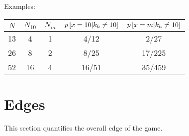 \noindent
Examples:
\begin{center}
\begin{tabular}{|c|c|c||c|c|}
\hline
$N$ & $N_10$ & $N_m$ & $p\left[x=10|k_h\neq{}10\right]$ & $p\left[x=m|k_h\neq{}10\right]$ \\ \hline \hline
13 & 4 & 1 & 4/12 & 2/27 \\ \hline
26 & 8 & 2 & 8/25 & 17/225 \\ \hline
52 & 16 & 4 & 16/51 & 35/459 \\ \hline
\end{tabular}
\end{center}

\section{Edges}
\label{sec:basic:edges}

This section quantifies the overall edge of the game.

